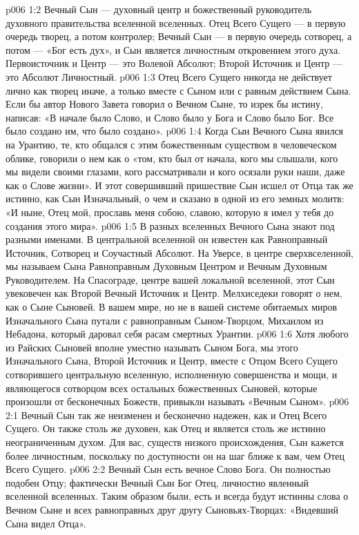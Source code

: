 \vs p006 1:2 Вечный Сын --- духовный центр и божественный руководитель духовного правительства вселенной вселенных. Отец Всего Сущего --- в первую очередь творец, а потом контролер; Вечный Сын --- в первую очередь сотворец, а потом ---  «Бог есть дух», и Сын является личностным откровением этого духа. Первоисточник и Центр --- это Волевой Абсолют; Второй Источник и Центр --- это Абсолют Личностный.
\vs p006 1:3 Отец Всего Сущего никогда не действует лично как творец иначе, а только вместе с Сыном или с равным действием Сына. Если бы автор Нового Завета говорил о Вечном Сыне, то изрек бы истину, написав: «В начале было Слово, и Слово было у Бога и Слово было Бог. Все было создано им, что было создано».
\vs p006 1:4 Когда Сын Вечного Сына явился на Урантию, те, кто общался с этим божественным существом в человеческом облике, говорили о нем как о «том, кто был от начала, кого мы слышали, кого мы видели своими глазами, кого рассматривали и кого осязали руки наши, даже как о Слове жизни». И этот совершивший пришествие Сын исшел от Отца так же истинно, как Сын Изначальный, о чем и сказано в одной из его земных молитв: «И ныне, Отец мой, прославь меня собою, славою, которую я имел у тебя до создания этого мира».
\vs p006 1:5 \pc В разных вселенных Вечного Сына знают под разными именами. В центральной вселенной он известен как Равноправный Источник, Сотворец и Соучастный Абсолют. На Уверсе, в центре сверхвселенной, мы называем Сына Равноправным Духовным Центром и Вечным Духовным Руководителем. На Спасограде, центре вашей локальной вселенной, этот Сын увековечен как Второй Вечный Источник и Центр. Мелхиседеки говорят о нем, как о Сыне Сыновей. В вашем мире, но не в вашей системе обитаемых миров Изначального Сына путали с равноправным Сыном\hyp{}Творцом, Михаилом из Небадона, который даровал себя расам смертных Урантии.
\vs p006 1:6 Хотя любого из Райских Сыновей вполне уместно называть Сыном Бога, мы этого Изначального Сына, Второй Источник и Центр, вместе с Отцом Всего Сущего сотворившего центральную вселенную, исполненную совершенства и мощи, и являющегося сотворцом всех остальных божественных Сыновей, которые произошли от бесконечных Божеств, привыкли называть «Вечным Сыном».
\vs p006 2:1 Вечный Сын так же неизменен и бесконечно надежен, как и Отец Всего Сущего. Он также столь же духовен, как Отец и является столь же истинно неограниченным духом. Для вас, существ низкого происхождения, Сын кажется более личностным, поскольку по доступности он на шаг ближе к вам, чем Отец Всего Сущего.
\vs p006 2:2 Вечный Сын есть вечное Слово Бога. Он полностью подобен Отцу; фактически Вечный Сын  Бог Отец, личностно явленный вселенной вселенных. Таким образом были, есть и всегда будут истинны слова о Вечном Сыне и всех равноправных друг другу Сыновьях\hyp{}Творцах: «Видевший Сына видел Отца».
